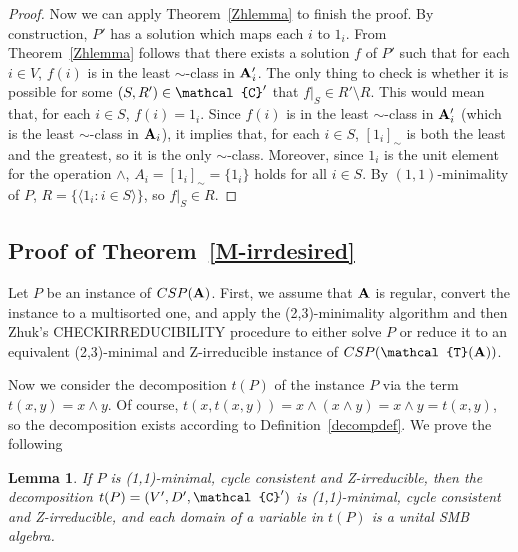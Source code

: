 \documentclass[11pt]{amsart}
\newcommand{\m}[1]{{\uppercase {\mathbf {#1}}}}
\newcommand{\vr}[1]{{\uppercase {\mathcal{#1}}}}
\newcommand{\lb}{\langle}
\newcommand{\rb}{\rangle}
\newcommand{\mt}{\wedge}
\newtheorem{lm}[thm]{Lemma}
\theoremstyle{definition}
\begin{document}
\begin{proof}
Now we can apply Theorem~\ref{Zhlemma} to finish the proof. By construction, $P'$ has a solution which maps each $i$ to $1_i$. From Theorem~\ref{Zhlemma} follows that there exists a solution $f$ of $P'$ such that for each $i\in V$, $f(i)$ is in the least $\sim$-class in $\m a_i'$. The only thing to check is whether it is possible for some $(S,R')\in\vr c'$ that $f|_S\in R'\setminus R$. This would mean that, for each $i\in S$, $f(i)=1_i$. Since $f(i)$ is in the least $\sim$-class in $\m a_i'$ (which is the least $\sim$-class in $\m a_i$), it implies that, for each $i\in S$, $[1_i]_\sim$ is both the least and the greatest, so it is the only $\sim$-class. Moreover, since $1_i$ is the unit element for the operation $\mt$, $A_i=[1_i]_\sim=\{1_i\}$ holds for all $i\in S$. By $(1,1)$-minimality of $P$, $R=\{\lb 1_i:i\in S\rb\}$, so $f|_S\in R$.
\end{proof}

\subsection*{Proof of Theorem~\ref{M-irrdesired}}

Let $P$ be an instance of $CSP(\m a)$. First, we assume that $\m a$ is regular, convert the instance to a multisorted one, and apply the (2,3)-minimality algorithm and then Zhuk's CHECKIRREDUCIBILITY procedure to either solve $P$ or reduce it to an equivalent (2,3)-minimal and Z-irreducible instance of $CSP(\vr t(\m a))$. 

Now we consider the decomposition $t(P)$ of the instance $P$ via the term $t(x,y)=x\mt y$. Of course, $t(x,t(x,y))=x\mt (x\mt y)=x\mt y=t(x,y)$, so the decomposition exists according to Definition~\ref{decompdef}. We prove the following

\begin{lm}\label{Z-irrtodecomp}
If $P$ is (1,1)-minimal, cycle consistent and Z-irreducible, then the decomposition $t(P)=(V',D',\vr c')$ is (1,1)-minimal, cycle consistent and Z-irreducible, and each domain of a variable in $t(P)$ is a unital SMB algebra.
\end{lm}
\end{document}
